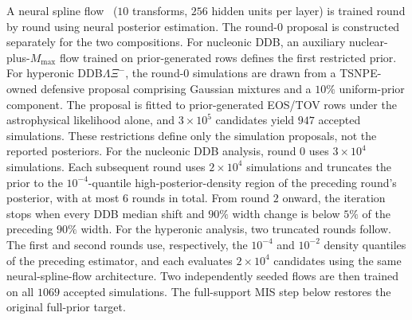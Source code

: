 \documentclass[aps,prd,twocolumn,superscriptaddress,nofootinbib,longbibliography]{revtex4-2}
\begin{document}
A neural spline flow~\cite{Durkan:2019nsq}
($10$ transforms, $256$ hidden units per layer) is
trained round by round using neural posterior
estimation. The round-$0$ proposal is
constructed separately for the two compositions. For
nucleonic DDB, an auxiliary nuclear-plus-$M_{\max}$ flow trained on
prior-generated rows defines the first restricted prior.
For hyperonic DDB$\Lambda\Xi^{-}$, the round-$0$
simulations are drawn from a TSNPE-owned defensive proposal comprising
Gaussian mixtures and a $10\%$ uniform-prior component. The proposal is fitted
to prior-generated EOS/TOV rows under the astrophysical likelihood alone, and
$3\times10^5$ candidates yield $947$ accepted simulations. These restrictions define only the simulation
proposals, not the reported posteriors. For the
nucleonic DDB analysis, round $0$ uses $3\times10^4$ simulations. Each
subsequent round uses $2\times10^4$ simulations and truncates the prior to the
$10^{-4}$-quantile high-posterior-density region of the preceding round's
posterior, with at most $6$ rounds in total. From round $2$ onward, the
iteration stops when every DDB median shift and $90\%$ width change is below
$5\%$ of the preceding $90\%$ width. For the
hyperonic analysis, two truncated rounds follow. The first and second rounds
use, respectively, the $10^{-4}$ and $10^{-2}$ density quantiles of the
preceding estimator, and each evaluates $2\times10^4$ candidates using the same
neural-spline-flow architecture. Two independently seeded flows are then
trained on all $1069$ accepted simulations. The full-support MIS step below
restores the original full-prior target.
\end{document}
